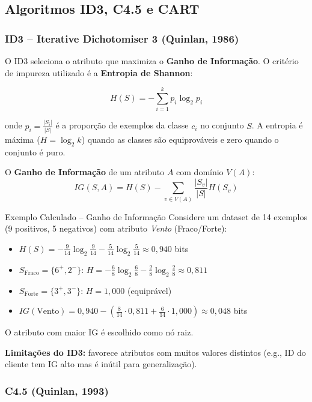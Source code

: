 \documentclass[12pt,a4paper]{article}
\begin{document}
\subsection{Algoritmos ID3, C4.5 e CART}

\subsubsection{ID3 -- Iterative Dichotomiser 3 (Quinlan, 1986)}

O ID3 seleciona o atributo que maximiza o \textbf{Ganho de Informação}. O critério de impureza utilizado é a \textbf{Entropia de Shannon}:

\[
  H(S) = -\sum_{i=1}^{k} p_i \log_2 p_i
\]

onde $p_i = \frac{|S_i|}{|S|}$ é a proporção de exemplos da classe $c_i$ no conjunto $S$. A entropia é máxima ($H = \log_2 k$) quando as classes são equiprováveis e zero quando o conjunto é puro.

O \textbf{Ganho de Informação} de um atributo $A$ com domínio $V(A)$:
\[
  IG(S, A) = H(S) - \sum_{v \in V(A)} \frac{|S_v|}{|S|} H(S_v)
\]

\begin{exemplobox}{Exemplo Calculado -- Ganho de Informação}
Considere um dataset de 14 exemplos (9 positivos, 5 negativos) com atributo \textit{Vento} (Fraco/Forte):
\begin{itemize}
  \item $H(S) = -\frac{9}{14}\log_2\frac{9}{14} - \frac{5}{14}\log_2\frac{5}{14} \approx 0{,}940$ bits
  \item $S_{\text{Fraco}} = \{6^+, 2^-\}$: $H = -\frac{6}{8}\log_2\frac{6}{8} - \frac{2}{8}\log_2\frac{2}{8} \approx 0{,}811$
  \item $S_{\text{Forte}} = \{3^+, 3^-\}$: $H = 1{,}000$ (equiprável)
  \item $IG(\text{Vento}) = 0{,}940 - \left(\frac{8}{14} \cdot 0{,}811 + \frac{6}{14} \cdot 1{,}000\right) \approx 0{,}048$ bits
\end{itemize}
O atributo com maior IG é escolhido como nó raiz.
\end{exemplobox}

\textbf{Limitações do ID3:} favorece atributos com muitos valores distintos (e.g., ID do cliente tem IG alto mas é inútil para generalização).

\subsubsection{C4.5 (Quinlan, 1993)}
\end{document}
